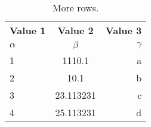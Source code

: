 \begin{table}[H]
  \begin{center}
    \caption{More rows.}
    \label{tab:table1}
    \begin{tabular}{l|c|r}
    \toprule
      \textbf{Value 1} & \textbf{Value 2} & \textbf{Value 3}\\
      $\alpha$ & $\beta$ & $\gamma$ \\
      \hline
      1 & 1110.1 & a\\
      2 & 10.1 & b\\
      3 & 23.113231 & c\\
      4 & 25.113231 & d\\ %
    \end{tabular}
  \end{center}
\end{table}
